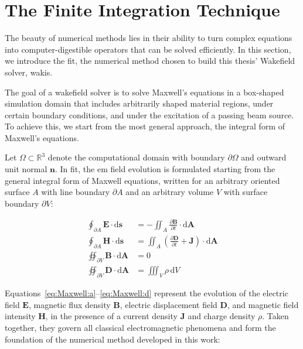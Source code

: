\newpage





\section{The Finite Integration Technique}
\label{sec:mge_final}

The beauty of numerical methods lies in their ability to turn complex equations into computer-digestible operators that can be solved efficiently. In this section, we introduce the \gls{fit}, the numerical method chosen to build this thesis' Wakefield solver, \gls{wakis}.

The goal of a wakefield solver is to solve Maxwell's equations in a box-shaped simulation domain that includes arbitrarily shaped material regions, under certain boundary conditions, and under the excitation of a passing beam source. To achieve this, we start from the most general approach, the integral form of Maxwell's equations.

Let $\Omega \subset \mathbb{R}^3$ denote the computational domain with boundary $\partial\Omega$ and outward unit normal $\mathbf{n}$. In
\gls{fit}, the \gls{em} field evolution is formulated starting from the general integral form of Maxwell equations, written for an arbitrary
oriented surface $A$ with line boundary $\partial A$ and an arbitrary volume $V$ with surface boundary $\partial V$:

\begin{align}
\oint_{\partial A} \mathbf{E}\cdot \mathrm{d}\mathbf{s} &= -\iint_{A}\frac{\partial \mathbf{B}}{\partial t}\cdot \mathrm{d}\mathbf{A} \label{eq:Maxwell:a}\\[6pt]
\oint_{\partial A} \mathbf{H}\cdot \mathrm{d}\mathbf{s} &= \iint_{A}\left(\frac{\partial \mathbf{D}}{\partial t} + \mathbf{J}\right)\cdot \mathrm{d}\mathbf{A} \label{eq:Maxwell:b}\\[6pt]
\oiint_{\partial V} \mathbf{B}\cdot \mathrm{d}\mathbf{A} &= 0 \label{eq:Maxwell:c}\\[6pt]
\oiint_{\partial V} \mathbf{D}\cdot \mathrm{d}\mathbf{A} &= \iiint_{V}\rho\, \mathrm{d}V \label{eq:Maxwell:d}
\end{align}

Equations~\eqref{eq:Maxwell:a}--\eqref{eq:Maxwell:d} represent the evolution of the electric field $\mathbf{E}$, magnetic flux density $\mathbf{B}$, electric displacement field $\mathbf{D}$, and magnetic field intensity $\mathbf{H}$, in the presence of a current density $\mathbf{J}$ and charge density $\rho$. Taken together, they govern all classical electromagnetic phenomena and form the foundation of the numerical method developed in this work:

